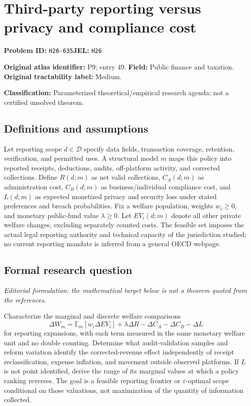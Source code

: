 \documentclass[11pt,a4paper]{article}
\begin{document}
\section*{Third-party reporting versus privacy and compliance cost}
\textbf{Problem ID:} \texttt{H26-635}\quad \textbf{JEL:} \texttt{H26}\par
\label{problem:OP-0049}
\label{atlas:prob:P9}
\noindent\textbf{Original atlas identifier:} P9; entry 49. \textbf{Field:} Public finance and taxation. \textbf{Original tractability label:} Medium.

\noindent\textbf{Classification:} Parameterized theoretical/empirical research agenda; not a certified unsolved theorem.

\subsection*{Definitions and assumptions}
Let reporting scope $d\in\mathcal D$ specify data fields, transaction coverage, retention, verification, and permitted uses. A structural model $m$ maps this policy into reported receipts, deductions, audits, off-platform activity, and corrected collections. Define $R(d;m)$ as net valid collections, $C_A(d;m)$ as administration cost, $C_B(d;m)$ as business/individual compliance cost, and $L(d;m)$ as expected monetized privacy and security loss under stated preferences and breach probabilities. Fix a welfare population, weights $w_i\geq0$, and monetary public-fund value $\lambda\geq0$. Let $EV_i(d;m)$ denote all other private welfare changes, excluding separately counted costs. The feasible set imposes the actual legal reporting authority and technical capacity of the jurisdiction studied; no current reporting mandate is inferred from a general OECD webpage.

\subsection*{Formal research question}
\emph{Editorial formulation: the mathematical target below is not a theorem quoted from the references.}

Characterize the marginal and discrete welfare comparisons
\[
 \Delta W_m=\mathbb E_m[w_i\Delta EV_i]+\lambda\Delta R-\Delta C_A-\Delta C_B-\Delta L
\]
for reporting expansions, with each term measured in the same monetary welfare unit and no double counting. Determine what audit-validation samples and reform variation identify the corrected-revenue effect independently of receipt reclassification, expense inflation, and movement outside observed platforms. If $L$ is not point identified, derive the range of its marginal values at which a policy ranking reverses. The goal is a feasible reporting frontier or $\varepsilon$-optimal scope conditional on those valuations, not maximization of the quantity of information collected.
\end{document}
